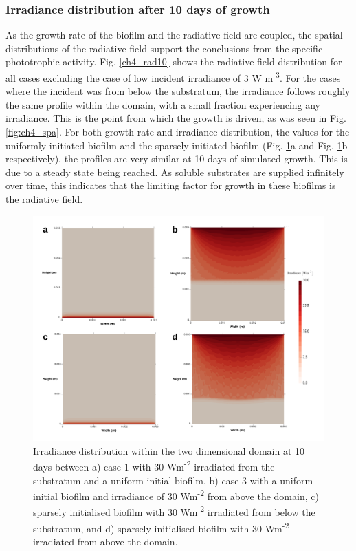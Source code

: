 \subsubsection{Irradiance distribution after 10 days of growth}
As the growth rate of the biofilm and the radiative field are coupled, the spatial distributions of the radiative field support the conclusions from the specific phototrophic activity. Fig. \ref{ch4_rad10} shows the radiative field distribution for all cases excluding the case of low incident irradiance of 3 W m\textsuperscript{-3}. For the cases where the incident was from below the substratum, the irradiance follows roughly the same profile within the domain, with a small fraction experiencing any irradiance. This is the point from which the growth is driven, as was seen in Fig. \ref{fig:ch4_spa}. For both growth rate and irradiance distribution, the values for the uniformly initiated biofilm and the sparsely initiated biofilm (Fig. \ref{fig:ch4_rad10}a and Fig. \ref{fig:ch4_rad10}b respectively), the profiles are very similar at 10 days of simulated growth. This is due to a steady state being reached. As soluble substrates are supplied infinitely over time, this indicates that the limiting factor for growth in these biofilms is the radiative field. 

\begin{figure}[H]
    \centering
    \includegraphics[width=\textwidth,height=0.5\textheight]{Chap4/results/post_processing/2D_cases/comparative/radiation.pdf}
    \caption{Irradiance distribution within the two dimensional domain at 10 days between a) case 1 with 30 Wm\textsuperscript{-2} irradiated from the substratum and a uniform initial biofilm, b) case 3 with a uniform initial biofilm and irradiance of 30 Wm\textsuperscript{-2} from above the domain, c) sparsely initialised biofilm with 30 Wm\textsuperscript{-2} irradiated from below the substratum, and d) sparsely initialised biofilm with 30 Wm\textsuperscript{-2} irradiated from above the domain.  } 
    \label{fig:ch4_rad10}
\end{figure}


